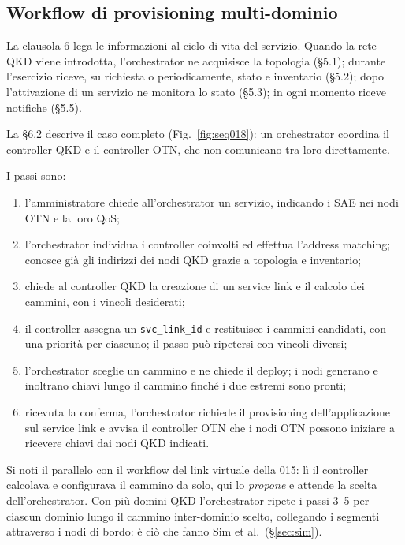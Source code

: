 \subsection{Workflow di provisioning multi-dominio}
\label{sec:workflow}

La clausola 6 lega le informazioni al ciclo di vita del servizio. Quando la
rete QKD viene introdotta, l'orchestrator ne acquisisce la topologia
(§5.1); durante l'esercizio riceve, su richiesta o periodicamente, stato e
inventario (§5.2); dopo l'attivazione di un servizio ne monitora lo stato
(§5.3); in ogni momento riceve notifiche (§5.5).

La §6.2 descrive il caso completo (Fig.~\ref{fig:seq018}): un orchestrator
coordina il controller QKD e il controller OTN, che non comunicano tra loro
direttamente.



I passi sono:
\begin{enumerate}
  \item l'amministratore chiede all'orchestrator un servizio, indicando i
        SAE nei nodi OTN e la loro QoS;
  \item l'orchestrator individua i controller coinvolti ed effettua
        l'address matching; conosce già gli indirizzi dei nodi QKD grazie
        a topologia e inventario;
  \item chiede al controller QKD la creazione di un service link e il
        calcolo dei cammini, con i vincoli desiderati;
  \item il controller assegna un \texttt{svc\_link\_id} e restituisce i
        cammini candidati, con una priorità per ciascuno; il passo può
        ripetersi con vincoli diversi;
  \item l'orchestrator sceglie un cammino e ne chiede il deploy; i nodi
        generano e inoltrano chiavi lungo il cammino finché i due estremi
        sono pronti;
  \item ricevuta la conferma, l'orchestrator richiede il provisioning
        dell'applicazione sul service link e avvisa il controller OTN che i
        nodi OTN possono iniziare a ricevere chiavi dai nodi QKD indicati.
\end{enumerate}
Si noti il parallelo con il workflow del link virtuale della 015: lì il
controller calcolava e configurava il cammino da solo, qui lo
\emph{propone} e attende la scelta dell'orchestrator. Con più domini QKD
l'orchestrator ripete i passi 3–5 per ciascun dominio lungo il cammino
inter-dominio scelto, collegando i segmenti attraverso i nodi di bordo: è
ciò che fanno Sim et al.\ (§\ref{sec:sim}).

